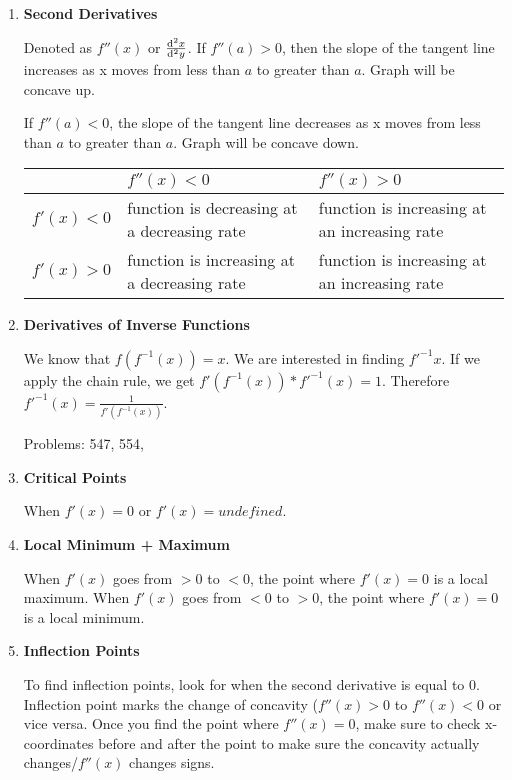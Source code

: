 \documentclass{article}
\begin{document}
\begin{enumerate}

\item \textbf{Second Derivatives}

Denoted as $f''(x)$ or $\frac{\odif[order={2}]{x}}{\odif[order={2}]{y}}$. 
If $f''(a) > 0$, then the slope of the tangent line increases as x moves from less than $a$ to greater than $a$. Graph will be concave up.

If $f''(a) < 0$, the slope of the tangent line decreases as x moves from less than $a$ to greater than $a$. Graph will be concave down.

\begin{center}
\begin{tabularx}{0.8\textwidth} {
| >{\raggedright\arraybackslash}X 
| >{\centering\arraybackslash}X 
| >{\raggedleft\arraybackslash}X |}
\hline
& $f''(x) < 0$ & $f''(x) > 0$ \\
\hline
$f'(x) < 0$ & function is decreasing at a decreasing rate & function is increasing at an increasing rate\\ 
\hline
$f'(x) > 0$ & function is increasing at a decreasing rate & function is increasing at an increasing rate \\
\hline
\end{tabularx}
\end{center}

\item \textbf{Derivatives of Inverse Functions}

We know that $f(f^{-1}(x)) = x$. We are interested in finding $f'^{-1}x$. If we apply the chain rule, we get $f'(f^{-1}(x)) * f'^{-1}(x) = 1$. Therefore
$f'^{-1}(x) = \frac{1}{f'(f^{-1}(x))}$.

Problems: 547, 554, 

\item \textbf{Critical Points}

When $f'(x) = 0$ or $f'(x) = undefined$. 

\item \textbf{Local Minimum + Maximum}

When $f'(x)$ goes from $ > 0$ to $ < 0$, the point where $f'(x) = 0$ is a local maximum. When $f'(x)$ goes from $ < 0$ to $ > 0$, the point where $f'(x) = 0$ is a local minimum. 

\item \textbf{Inflection Points}

To find inflection points, look for when the second derivative is equal to 0. Inflection point marks the change of concavity ($f''(x) > 0$ to $f''(x) < 0$ or vice versa. Once you find the point where $f''(x) = 0$, make sure to check x-coordinates before and after the point to make sure the concavity actually changes/$f''(x)$ changes signs. 


\end{enumerate}
\end{document}
